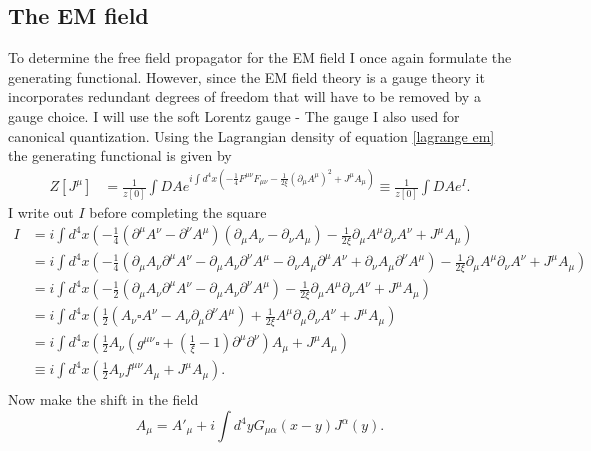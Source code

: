 \subsection*{The EM field} 
To determine the free field propagator for the EM field I once again formulate the generating functional. However, since the EM field theory is a gauge theory it incorporates redundant degrees of freedom that will have to be removed by a gauge choice. I will use the soft Lorentz gauge - The gauge I also used for canonical quantization. Using the Lagrangian density of equation \eqref{lagrange em} the generating functional is given by
\begin{equation}
	\begin{split}
		Z[J^\mu]&=\frac{1}{z[0]}\int DAe^{i\int d^4x (-\frac{1}{4}F^{\mu\nu}F_{\mu\nu}-\frac{1}{2\xi}(\partial_\mu A^\mu)^2+J^\mu A_\mu)}\equiv\frac{1}{z[0]}\int DAe^I.
	\end{split}
\end{equation} 
I write out $I$ before completing the square
 \begin{equation}
	\begin{split}
		I&=i\int d^4x (-\frac{1}{4}(\partial^\mu A^\nu-\partial^\nu A^\mu)(\partial_\mu A_\nu-\partial_\nu A_\mu)-\frac{1}{2\xi}\partial_\mu A^\mu\partial_\nu A^\nu+J^\mu A_\mu)\\
		&=i\int d^4x (-\frac{1}{4}(\partial_\mu A_\nu\partial^\mu A^\nu-\partial_\mu A_\nu\partial^\nu A^\mu-\partial_\nu A_\mu\partial^\mu A^\nu+\partial_\nu A_\mu\partial^\nu A^\mu)-\frac{1}{2\xi}\partial_\mu A^\mu\partial_\nu A^\nu+J^\mu A_\mu)\\
		&=i\int d^4x (-\frac{1}{2}(\partial_\mu A_\nu\partial^\mu A^\nu-\partial_\mu A_\nu\partial^\nu A^\mu)-\frac{1}{2\xi}\partial_\mu A^\mu\partial_\nu A^\nu+J^\mu A_\mu)\\
		&=i\int d^4x (\frac{1}{2}(A_\nu\square A^\nu- A_\nu\partial_\mu\partial^\nu A^\mu)+\frac{1}{2\xi} A^\mu\partial_\mu\partial_\nu A^\nu+J^\mu A_\mu)\\
		&=i\int d^4x (\frac{1}{2}A_\nu(g^{\mu\nu}\square+(\frac{1}{\xi}-1)\partial^\mu\partial^\nu)A_\mu+J^\mu A_\mu)\\
		&\equiv i\int d^4x (\frac{1}{2}A_\nu f^{\mu\nu}A_\mu+J^\mu A_\mu).\\
	\end{split}
\end{equation} 
Now make the shift in the field
\begin{equation}
	A_\mu=A'_\mu+i\int d^4yG_{\mu\alpha}(x-y)J^\alpha(y).
\end{equation} 
